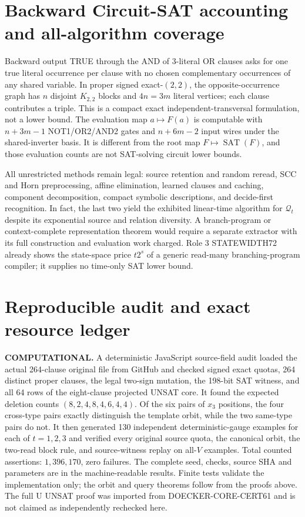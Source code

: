 \documentclass[11pt]{article}
\begin{document}
\section{Backward Circuit-SAT accounting and all-algorithm coverage}
Backward output TRUE through the AND of 3-literal OR clauses asks for one true literal occurrence per clause with no chosen complementary occurrences of any shared variable. In proper signed exact-$(2,2)$, the opposite-occurrence graph has $n$ disjoint $K_{2,2}$ blocks and $4n=3m$ literal vertices; each clause contributes a triple. This is a compact exact independent-transversal formulation, not a lower bound. The evaluation map $a\mapsto F(a)$ is computable with $n+3m-1$ NOT1/OR2/AND2 gates and $n+6m-2$ input wires under the shared-inverter basis. It is different from the root map $F\mapsto\operatorname{SAT}(F)$, and those evaluation counts are not SAT-solving circuit lower bounds.

All unrestricted methods remain legal: source retention and random reread, SCC and Horn preprocessing, affine elimination, learned clauses and caching, component decomposition, compact symbolic descriptions, and decide-first recognition. In fact, the last two yield the exhibited linear-time algorithm for $\mathcal Q_t$ despite its exponential source and relation diversity. A branch-program or context-complete representation theorem would require a separate extractor with its full construction and evaluation work charged. Role 3 STATEWIDTH72 already shows the state-space price $t2^s$ of a generic read-many branching-program compiler; it supplies no time-only SAT lower bound.

\section{Reproducible audit and exact resource ledger}
\textbf{COMPUTATIONAL.} A deterministic JavaScript source-field audit loaded the actual 264-clause original file from GitHub and checked signed exact quotas, 264 distinct proper clauses, the legal two-sign mutation, the 198-bit SAT witness, and all 64 rows of the eight-clause projected UNSAT core. It found the expected deletion counts $(8,2,4,8,4,6,4,4)$. Of the six pairs of $x_3$ positions, the four cross-type pairs exactly distinguish the template orbit, while the two same-type pairs do not. It then generated 130 independent deterministic-gauge examples for each of $t=1,2,3$ and verified every original source quota, the canonical orbit, the two-read block rule, and source-witness replay on all-$V$ examples. Total counted assertions: $1{,}396{,}170$, zero failures. The complete seed, checks, source SHA and parameters are in the machine-readable results. Finite tests validate the implementation only; the orbit and query theorems follow from the proofs above. The full U UNSAT proof was imported from DOECKER-CORE-CERT61 and is not claimed as independently rechecked here.
\end{document}
